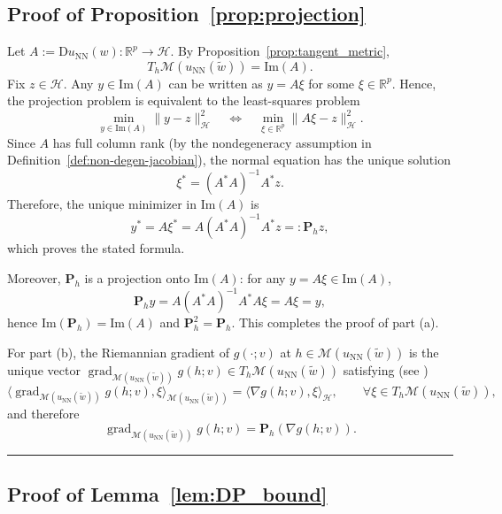 \documentclass[twoside,11pt]{article}
\newcommand{\BlackBoxProof}{\rule{1.5ex}{1.5ex}}
\renewenvironment{proof}{\par\noindent{\bf Proof\ }}{\hfill\BlackBoxProof\par\medskip}
\renewcommand{\P}{\mathbf{P}}
\newcommand{\D}{\mathrm{D}}
\newcommand{\NN}{\mathrm{NN}}
\begin{document}
\subsection{Proof of Proposition~\ref{prop:projection}}\label{app:proof-projection}
\begin{proof}
Let $A:=\D u_\NN(w):\mathbb R^p\to\mathcal H$. By Proposition~\ref{prop:tangent_metric},
\[
T_h\mathcal M(u_\NN(\tilde w))=\mathrm{Im}(A).
\]
Fix $z\in\mathcal H$. Any $y\in \mathrm{Im}(A)$ can be written as $y=A\xi$ for some $\xi\in\mathbb R^p$.
Hence, the projection problem is equivalent to the least-squares problem
\[
\min_{y\in \mathrm{Im}(A)}\|y-z\|_{\mathcal H}^2
\quad\Longleftrightarrow\quad
\min_{\xi\in\mathbb R^p}\|A\xi-z\|_{\mathcal H}^2.
\]
Since $A$ has full column rank (by the nondegeneracy assumption in Definition~\ref{def:non-degen-jacobian}),
the normal equation has the unique solution
\[
\xi^*=(A^*A)^{-1}A^*z.
\]
Therefore, the unique minimizer in $\mathrm{Im}(A)$ is
\[
y^*=A\xi^*=A(A^*A)^{-1}A^*z =: \P_h z,
\]
which proves the stated formula.

Moreover, $\P_h$ is a projection onto $\mathrm{Im}(A)$: for any $y=A\xi\in \mathrm{Im}(A)$,
\[
\P_h y = A(A^*A)^{-1}A^*A\xi = A\xi = y,
\]
hence $\mathrm{Im}(\P_h)=\mathrm{Im}(A)$ and $\P_h^2=\P_h$. This completes the proof of part (a).

For part (b), the Riemannian gradient of $g(\cdot; v)$ at $h \in \mathcal{M}( u_\NN(\tilde w))$
is the unique vector $\operatorname{grad}_{\mathcal{M}( u_\NN(\tilde w))} g(h; v)\in T_h\mathcal{M}( u_\NN(\tilde w))$
satisfying (see \citep[Section~3.6.1]{ambrosio2005gradient})
\[
\langle\operatorname{grad}_{\mathcal{M}( u_\NN(\tilde w))} g(h; v),\xi\rangle_{\mathcal{M}( u_\NN(\tilde w))}
 = \langle\nabla g(h; v),\xi\rangle_{\mathcal H},
 \qquad \forall \xi\in T_h\mathcal{M}( u_\NN(\tilde w)),
\]
and therefore
\[
\operatorname{grad}_{\mathcal{M}( u_\NN(\tilde w))} g(h; v)
   =\P_h \left( \nabla g(h; v) \right).
\]
\end{proof}

\subsection{Proof of Lemma~\ref{lem:DP_bound}}\label{app:proof-of-lemmas}
\end{document}
